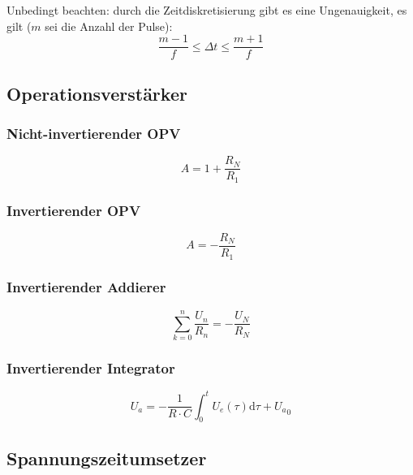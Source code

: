 Unbedingt beachten: durch die Zeitdiskretisierung gibt es eine Ungenauigkeit, es gilt ($m$ sei die Anzahl der Pulse):
\begin{equation*}
    \frac{m-1}{f} \leq \Delta t \leq \frac{m+1}{f}
\end{equation*}

\subsection{Operationsverstärker}

\subsubsection{Nicht-invertierender OPV}
\begin{equation*}
    A = 1 + \frac{R_N}{R_1}
\end{equation*}

\subsubsection{Invertierender OPV}
\begin{equation*}
    A = - \frac{R_N}{R_1}
\end{equation*}

\subsubsection{Invertierender Addierer}
\begin{equation*}
    \sum_{k=0}^n \frac{U_n}{R_n} = - \frac{U_N}{R_N}
\end{equation*}

\subsubsection{Invertierender Integrator}
\begin{equation*}
    U_a = -\frac{1}{R\cdot C} \int_0^t U_e(\tau) \text{d}\tau + {U_a}_0
\end{equation*}

\subsection{Spannungszeitumsetzer}
